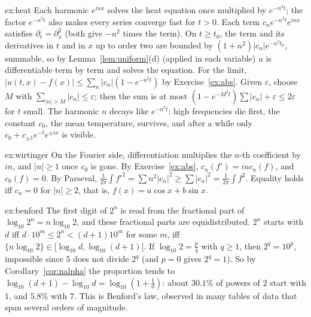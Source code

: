 \begin{solution}{ex:heat}
\idea Each harmonic $e^{inx}$ solves the heat equation once multiplied by $e^{-n^2t}$; the factor $e^{-n^2t}$ also makes every series
converge fast for $t>0$.
\writeup Each term $c_ne^{-n^2t}e^{inx}$ satisfies $\partial_t=\partial_x^2$ (both give $-n^2$ times the term). On $t\ge t_0$, the term and its derivatives in $t$
and in $x$ up to order two are bounded by $(1+n^2)|c_n|e^{-n^2t_0}$, summable, so by Lemma~\ref{lem:uniform}(d) (applied in each variable)
$u$ is differentiable term by term and solves the equation. For the limit, $|u(t,x)-f(x)|\le\sum_n|c_n|(1-e^{-n^2t})$ by Exercise~\ref{ex:abs}.
Given $\varepsilon$, choose $M$ with $\sum_{|n|>M}|c_n|\le\varepsilon$; then the sum is at most $(1-e^{-M^2t})\sum|c_n|+\varepsilon\le2\varepsilon$ for $t$ small. The harmonic
$n$ decays like $e^{-n^2t}$: high frequencies die first, the constant $c_0$, the mean temperature, survives, and after a while
only $c_0+c_{\pm1}e^{-t}e^{\pm ix}$ is visible.
\end{solution}

\begin{solution}{ex:wirtinger}
\idea On the Fourier side, differentiation multiplies the $n$-th coefficient by $in$, and $|n|\ge1$ once $c_0$ is gone.
\writeup By Exercise~\ref{ex:abs}, $c_n(f')=inc_n(f)$, and $c_0(f)=0$. By Parseval,
$\frac1{2\pi}\int f'^2=\sum n^2|c_n|^2\ge\sum|c_n|^2=\frac1{2\pi}\int f^2$. Equality holds iff $c_n=0$ for $|n|\ge2$, that is, $f(x)=a\cos x+b\sin x$.
\end{solution}

\begin{solution}{ex:benford}
\idea The first digit of $2^n$ is read from the fractional part of $\log_{10}2^n=n\log_{10}2$, and these fractional parts are equidistributed.
\writeup $2^n$ starts with $d$ iff $d\cdot10^m\le2^n<(d+1)10^m$ for some $m$, iff $\{n\log_{10}2\}\in[\log_{10}d,\log_{10}(d+1)[$. If $\log_{10}2=\frac pq$ with $q\ge1$,
then $2^q=10^p$, impossible since $5$ does not divide $2^q$ (and $p=0$ gives $2^q=1$). So by Corollary~\ref{cor:nalpha} the proportion tends
to $\log_{10}(d+1)-\log_{10}d=\log_{10}(1+\frac1d)$: about $30.1\%$ of powers of $2$ start with $1$, and $5.8\%$ with $7$. This is Benford's law,
observed in many tables of data that span several orders of magnitude.
\end{solution}

